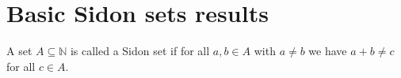 %

\section{Basic Sidon sets results}

\begin{definition}\leanok
    A set $A \subseteq \mathbb{N}$ is called a Sidon set if for all $a, b \in A$ with $a \neq b$ we have $a + b \neq c$ for all $c \in A$.
\end{definition}